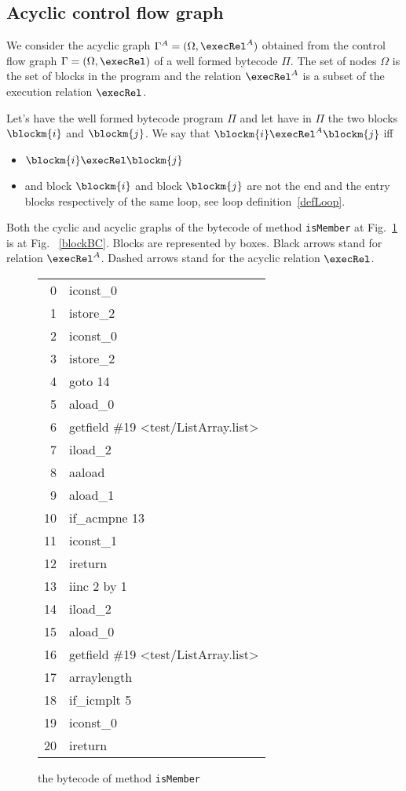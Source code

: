 \subsection{Acyclic control flow graph} \label{graph}
We consider the acyclic graph $\Gamma^A = ( \Omega, \execRel^A)$ obtained from the control flow graph 
$\Gamma  = ( \Omega, \execRel)$ of a well formed bytecode $ \Pi $. The set of nodes $\Omega$ is the set of  blocks in the 
program and the relation  $\execRel^A$ is a subset of the  execution relation $\execRel$.
\begin{defn}
\label{acyclicExRel}
Let's have the well formed bytecode program $\Pi$ and let have in $\Pi$ the two blocks  $\blockm{i} $ and   $\blockm{j}$. We say 
that $\blockm{i} \execRel^A \blockm{j}$ iff
\begin{itemize}
\item $\blockm{i} \execRel \blockm{j}$
\item and block $\blockm{i}$ and block $\blockm{j}$ are not the end and the entry blocks respectively of the same loop, see loop definition~\ref{defLoop}.
\end{itemize}
\end{defn}

Both the cyclic and acyclic graphs of the bytecode of method \texttt{isMember} at Fig.~\ref{isMemBC} is at Fig. ~\ref{blockBC}. Blocks are represented by boxes. Black arrows stand for relation $\execRel^A$. Dashed arrows stand for the acyclic relation $\execRel$.

\begin{figure}[p]
\begin{center}
\begin{tabular}{rl}
 0 & iconst\_0 \\
 1 & istore\_2 \\
 2 & iconst\_0 \\
 3 & istore\_2 \\
 4 & goto 14 \\
 5 & aload\_0 \\
 6 & getfield \#19 <test/ListArray.list> \\
 7 & iload\_2 \\
 8 & aaload \\
 9 & aload\_1 \\
10 & if\_acmpne 13 \\
11 & iconst\_1 \\
12 & ireturn \\
13 & iinc 2 by 1 \\
14 & iload\_2 \\
15 & aload\_0 \\
16 & getfield \#19 <test/ListArray.list> \\
17 & arraylength \\
18 & if\_icmplt 5  \\
19 & iconst\_0 \\
20 & ireturn \\
\end{tabular}
\end{center}
\caption{the bytecode of method \texttt{isMember}}
\label{isMemBC}
\end{figure}

